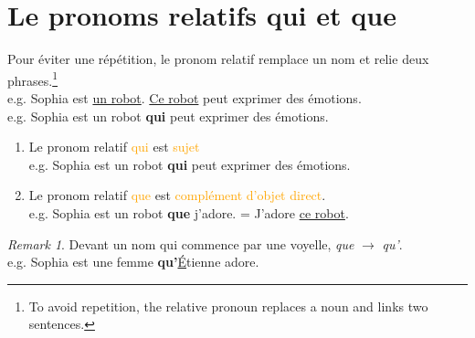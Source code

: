 \documentclass[math,code]{amznotes}
\theoremstyle{remark}
\newtheorem*{remark}{Remark}
\begin{document}
\section{Le pronoms relatifs qui et que}
Pour éviter une répétition, le pronom relatif remplace un nom et relie deux phrases.\footnote{To avoid repetition, the relative pronoun replaces a noun and links two sentences.} \\
e.g. Sophia est \underline{un robot}. \underline{Ce robot} peut exprimer des émotions. \\
e.g. Sophia est un robot \textbf{qui} peut exprimer des émotions.
\begin{enumerate}
    \item Le pronom relatif \textcolor{orange}{qui} est \textcolor{orange}{sujet} \\
    e.g. Sophia est un robot \textbf{qui} peut exprimer des émotions.
    \item Le pronom relatif \textcolor{orange}{que} est \textcolor{orange}{complément d'objet direct}. \\
    e.g. Sophia est un robot \textbf{que} j'adore. = J'adore \underline{ce robot}.
\end{enumerate}
\begin{notebox}
    \begin{remark}
        Devant un nom qui commence par une voyelle, \textit{que} $\rightarrow$ \textit{qu'}. \\
        e.g. Sophia est une femme \textbf{qu'}\underline{É}tienne adore.
    \end{remark}
\end{notebox}
\end{document}
